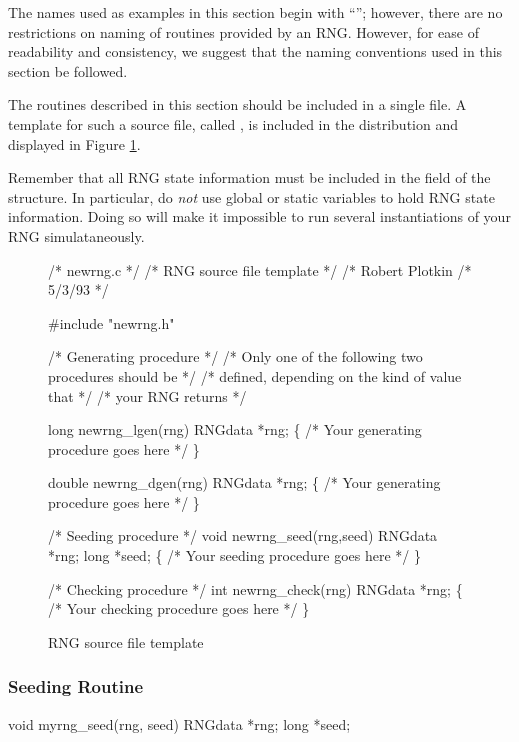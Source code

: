 The names used as examples in this section begin with ``'';
however, there are no restrictions on naming of routines provided by an
RNG.  However, for ease of readability and consistency, we suggest that
the naming conventions used in this section be followed.

The routines described in this section should be included in a single
 file.  A template for such a source file, called
, is included in the distribution and displayed in Figure
\ref{fig:newrng.c}.

Remember that all RNG state information must be included in the
 field of the  structure.  In particular,
do {\em not} use global or static variables to hold RNG state
information.  Doing so will make it impossible to run several
instantiations of your RNG simulataneously.

\begin{figure}
\begin{example}
/* newrng.c */
/* RNG source file template */
/* Robert Plotkin
/* 5/3/93 */

#include "newrng.h"

/* Generating procedure */
/* Only one of the following two procedures should be */
/* defined, depending on the kind of value that */
/* your RNG returns */

long newrng_lgen(rng)
RNGdata *rng;
\{
/* Your generating procedure goes here */
\}

double newrng_dgen(rng)
RNGdata *rng;
\{
/* Your generating procedure goes here */
\}

/* Seeding procedure */
void newrng_seed(rng,seed)
RNGdata *rng;
long *seed;
\{
/* Your seeding procedure goes here */
\}

/* Checking procedure */
int newrng_check(rng)
RNGdata *rng;
\{
/* Your checking procedure goes here */
\}
\end{example}
\caption{RNG source file template}
\label{fig:newrng.c}
\end{figure}

\subsubsection{Seeding Routine}

\begin{example}
	void myrng_seed(rng, seed)
	RNGdata *rng;
	long *seed;\\
\end{example}

